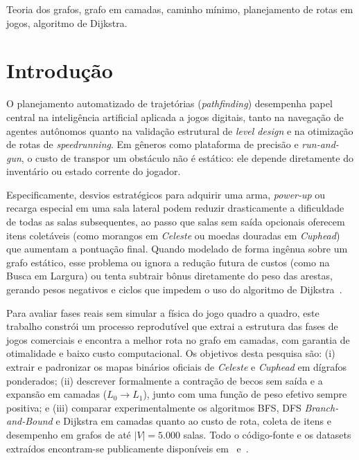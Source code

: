 \documentclass[conference]{IEEEtran}
\begin{document}
\begin{IEEEkeywords}
Teoria dos grafos, grafo em camadas, caminho m\'inimo, planejamento de rotas em jogos, algoritmo de Dijkstra.
\end{IEEEkeywords}

\section{Introdu\c{c}\~ao}

O planejamento automatizado de trajet\'orias (\textit{pathfinding}) desempenha papel central na intelig\^encia artificial aplicada a jogos digitais, tanto na navega\c{c}\~ao de agentes aut\^onomos quanto na valida\c{c}\~ao estrutural de \textit{level design} e na otimiza\c{c}\~ao de rotas de \textit{speedrunning}. Em g\^eneros como plataforma de precis\~ao e \textit{run-and-gun}, o custo de transpor um obst\'aculo n\~ao \'e est\'atico: ele depende diretamente do invent\'ario ou estado corrente do jogador.

Especificamente, desvios estrat\'egicos para adquirir uma arma, \textit{power-up} ou recarga especial em uma sala lateral podem reduzir drasticamente a dificuldade de todas as salas subsequentes, ao passo que salas sem sa\'ida opcionais oferecem itens colet\'aveis (como morangos em \textit{Celeste} ou moedas douradas em \textit{Cuphead}) que aumentam a pontua\c{c}\~ao final. Quando modelado de forma ing\^enua sobre um grafo est\'atico, esse problema ou ignora a redu\c{c}\~ao futura de custos (como na Busca em Largura) ou tenta subtrair b\^onus diretamente do peso das arestas, gerando pesos negativos e ciclos que impedem o uso do algoritmo de Dijkstra~\cite{dijkstra1959,cormen2022}.

Para avaliar fases reais sem simular a f\'isica do jogo quadro a quadro, este trabalho constr\'oi um processo reprodut\'ivel que extrai a estrutura das fases de jogos comerciais e encontra a melhor rota no grafo em camadas, com garantia de otimalidade e baixo custo computacional. Os objetivos desta pesquisa s\~ao: (i) extrair e padronizar os mapas bin\'arios oficiais de \textit{Celeste} e \textit{Cuphead} em d\'igrafos ponderados; (ii) descrever formalmente a contra\c{c}\~ao de becos sem sa\'ida e a expans\~ao em camadas ($L_0 \to L_1$), junto com uma fun\c{c}\~ao de peso efetivo sempre positiva; e (iii) comparar experimentalmente os algoritmos BFS, DFS \textit{Branch-and-Bound} e Dijkstra em camadas quanto ao custo de rota, coleta de itens e desempenho em grafos de at\'e $|V|=5.000$ salas. Todo o c\'odigo-fonte e os datasets extra\'idos encontram-se publicamente dispon\'iveis em~\cite{repo_codigo} e~\cite{dataset_zenodo}.
\end{document}
